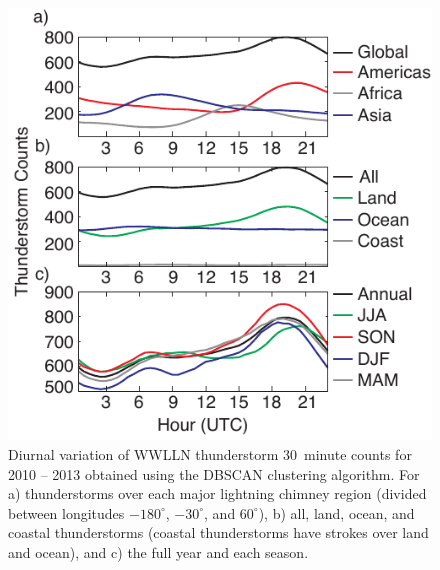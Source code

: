  \begin{figure}[ht!]
    \centering
     \includegraphics[scale=1]{GEC/Figures/carnegie.pdf} 
    \caption{Diurnal variation of WWLLN thunderstorm 30~minute counts for 2010 -- 2013 obtained using the DBSCAN clustering algorithm.
    		 For a) thunderstorms over each major lightning chimney region (divided between longitudes $-180^\circ$, $-30^\circ$, and $60^\circ$),
		 b) all, land, ocean, and coastal thunderstorms (coastal thunderstorms have strokes over land and ocean), 
		 and c) the full year and each season.
		 }
    \label{carnegie}
 \end{figure}

